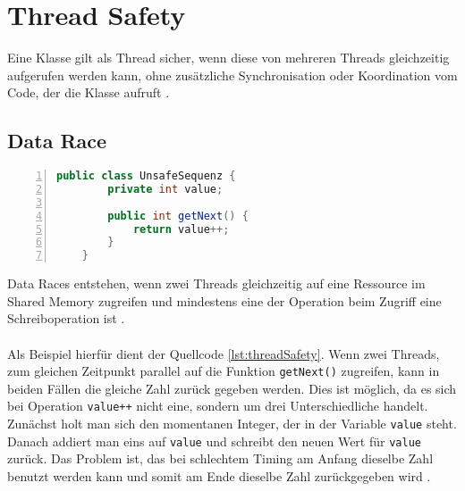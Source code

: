 \section{Thread Safety}\label{sec:threadSafety}

Eine Klasse gilt als Thread sicher, wenn diese von mehreren Threads gleichzeitig aufgerufen werden kann, ohne zusätzliche Synchronisation oder Koordination vom Code, der die Klasse aufruft \cite[vgl.][12]{brian}.



\subsection*{Data Race}
\begin{lstlisting}[language=Java,frame=tb,caption={Non-thread-safe Sequence Generator \cite{brian}}, label={lst:threadSafety}, numbers=left, stepnumber=1, captionpos=b]
	public class UnsafeSequenz {
		private int value;
		
		public int getNext() {
			return value++;
		}
	}
\end{lstlisting}

Data Races entstehen, wenn zwei Threads gleichzeitig auf eine Ressource im Shared Memory zugreifen und mindestens eine der Operation beim Zugriff eine Schreiboperation ist \cite[vgl.][72]{banerjee_theory_2006}.\\ 
\\
Als Beispiel hierfür dient der Quellcode \ref{lst:threadSafety}. Wenn zwei Threads, zum gleichen Zeitpunkt parallel auf die Funktion \texttt{getNext()} zugreifen, kann in beiden Fällen die gleiche Zahl zurück gegeben werden. Dies ist möglich, da es sich bei Operation \texttt{value++} nicht eine, sondern um drei Unterschiedliche handelt. Zunächst holt man sich den momentanen Integer, der in der Variable \texttt{value} steht. Danach addiert man eins auf \texttt{value} und schreibt den neuen Wert für \texttt{value} zurück. Das Problem ist, das bei schlechtem Timing am Anfang dieselbe Zahl benutzt werden kann und somit am Ende dieselbe Zahl zurückgegeben wird \cite[vgl.][5]{brian}.

